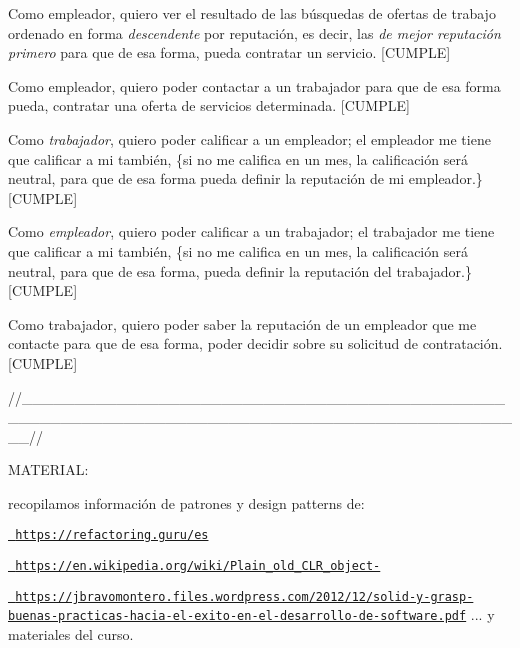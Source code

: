 Como empleador, quiero ver el resultado de las búsquedas de ofertas de trabajo ordenado en forma {\itshape descendente} por reputación, es decir, las {\itshape de mejor reputación primero} para que de esa forma, pueda contratar un servicio. \mbox{[}CUMPLE\mbox{]}

Como empleador, quiero poder contactar a un trabajador para que de esa forma pueda, contratar una oferta de servicios determinada. \mbox{[}CUMPLE\mbox{]}

Como {\itshape trabajador}, quiero poder calificar a un empleador; el empleador me tiene que calificar a mi también, \{si no me califica en un mes, la calificación será neutral, para que de esa forma pueda definir la reputación de mi empleador.\} \mbox{[}CUMPLE\mbox{]}

Como {\itshape empleador}, quiero poder calificar a un trabajador; el trabajador me tiene que calificar a mi también, \{si no me califica en un mes, la calificación será neutral, para que de esa forma, pueda definir la reputación del trabajador.\} \mbox{[}CUMPLE\mbox{]}


\begin{DoxyItemize}
\item Como trabajador, quiero poder saber la reputación de un empleador que me contacte para que de esa forma, poder decidir sobre su solicitud de contratación. \mbox{[}CUMPLE\mbox{]}
\end{DoxyItemize}

//\+\_\+\+\_\+\+\_\+\+\_\+\+\_\+\+\_\+\+\_\+\+\_\+\+\_\+\+\_\+\+\_\+\+\_\+\+\_\+\+\_\+\+\_\+\+\_\+\+\_\+\+\_\+\+\_\+\+\_\+\+\_\+\+\_\+\+\_\+\+\_\+\+\_\+\+\_\+\+\_\+\+\_\+\+\_\+\+\_\+\+\_\+\+\_\+\+\_\+\+\_\+\+\_\+\+\_\+\+\_\+\+\_\+\+\_\+\+\_\+\+\_\+\+\_\+\+\_\+\+\_\+\+\_\+\+\_\+\+\_\+\+\_\+\+\_\+\+\_\+\+\_\+\+\_\+\+\_\+\+\_\+\+\_\+\+\_\+\+\_\+\+\_\+\+\_\+\+\_\+\+\_\+\+\_\+\+\_\+\+\_\+\+\_\+\+\_\+\+\_\+\+\_\+\+\_\+\+\_\+\+\_\+\+\_\+\+\_\+\+\_\+\+\_\+\+\_\+\+\_\+\+\_\+\+\_\+\+\_\+\+\_\+\+\_\+\+\_\+\+\_\+\+\_\+\+\_\+\+\_\+\+\_\+\+\_\+\+\_\+\+\_\+\+\_\+\+\_\+\+\_\+\+\_\+\+\_\+//

MATERIAL\+:

recopilamos información de patrones y design patterns de\+:
\begin{DoxyItemize}
\item \href{https://refactoring.guru/es}{\texttt{ https\+://refactoring.\+guru/es}}
\item \href{https://en.wikipedia.org/wiki/Plain_old_CLR_object-}{\texttt{ https\+://en.\+wikipedia.\+org/wiki/\+Plain\+\_\+old\+\_\+\+CLR\+\_\+object-\/}}
\item \href{https://jbravomontero.files.wordpress.com/2012/12/solid-y-grasp-buenas-practicas-hacia-el-exito-en-el-desarrollo-de-software.pdf}{\texttt{ https\+://jbravomontero.\+files.\+wordpress.\+com/2012/12/solid-\/y-\/grasp-\/buenas-\/practicas-\/hacia-\/el-\/exito-\/en-\/el-\/desarrollo-\/de-\/software.\+pdf}} ... y materiales del curso.
\end{DoxyItemize}

